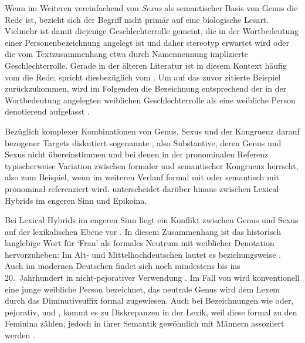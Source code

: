 Wenn im Weiteren vereinfachend von \textit{Sexus} als semantischer Basis von
Genus die Rede ist, bezieht sich der Begriff nicht primär auf eine biologische
Lesart. Vielmehr ist damit diejenige Geschlechter\-rolle gemeint, die in der
Wortbedeutung einer Personenbezeichnung angelegt ist und daher stereotyp
erwartet wird oder die vom Textzusammenhang etwa durch Namennennung implizierte
Geschlechterrolle. Gerade in der älteren Literatur ist in diesem Kontext häufig
vom  die Rede; \citet[67]{panther2009} spricht
diesbezüglich vom . Um auf das zuvor zitierte Beispiel
zurückzukommen, wird im Folgenden die Bezeichnung  entsprechend der
in der Wortbedeutung angelegten weiblichen Geschlechterrolle als eine weibliche
Person denotierend aufgefasst
\autocite[vgl.][s.\,v.~]{duden-online}.

Bezüglich komplexer Kombinationen von Genus, Sexus und der Kongruenz darauf
bezogener Targets diskutiert \textcite[183--184]{corbett1991} sogenannte
, also Substantive, deren Genus und Sexus nicht
übereinstimmen und bei denen in der pronominalen Referenz typischerweise
Variation zwischen formaler und semantischer Kongruenz herrscht, also zum
Beispiel, wenn  im weiteren Verlauf formal mit  oder
semantisch mit  pronominal referenziert wird. \citet{klein2022}
unterscheidet darüber hinaus zwischen Lexical Hybrids im engeren Sinn und
Epikoina.

Bei Lexical Hybrids im engeren Sinn liegt ein Konflikt zwischen Genus und Sexus
auf der lexikalischen Ebene vor \autocite[145]{klein2022}. In diesem
Zusammenhang ist das historisch langlebige Wort für `Frau' als formales
Neutrum mit weiblicher Denotation hervorzuheben: Im Alt- und
Mittelhochdeutschen lautet es  beziehungsweise . Auch im
modernen Deutschen findet sich  noch mindestens bis ins
20.~Jahrhundert in nicht-pejorativer Verwendung \autocite[166]{fleischer2012}.
Im Fall von  wird konventionell eine junge weibliche Person
bezeichnet, das neutrale Genus wird dem Lexem durch das Diminutivsuffix
 formal zugewiesen. Auch bei Bezeichnungen wie  oder,
pejorativ,  und , kommt es zu Diskrepanzen in der
Lexik, weil diese formal zu den Feminina zählen, jedoch in ihrer Semantik
gewöhnlich mit Männern assoziiert werden
\autocite[vgl.~auch][67--68]{panther2009}.

